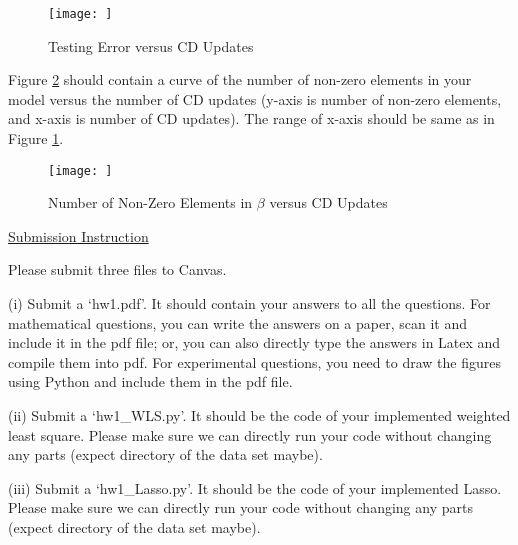 \documentclass{llncs}
\begin{document}
\begin{figure}[h]
    \centering
    \texttt{[image: ]}
    \caption{Testing Error versus CD Updates}
    \label{fig1}
\end{figure}

Figure \ref{fig2} should contain a curve of the number of non-zero elements in your model 
versus the number of CD updates (y-axis is number of non-zero elements, and x-axis is number of CD updates). The range of x-axis should be same 
as in Figure \ref{fig1}. 

\begin{figure}[h]
    \centering
    \texttt{[image: ]}
    \caption{Number of Non-Zero Elements in 
    $\beta$ versus CD Updates}
    \label{fig2}
\end{figure}

\vfill

\underline{Submission Instruction}

Please submit three files to Canvas. 

(i) Submit a `hw1.pdf'. It should contain 
your answers to all the questions. 
For mathematical questions, you can 
write the answers on a paper, scan it and 
include it in the pdf file; or, you can 
also directly type the answers in Latex 
and compile them into pdf. For experimental 
questions, you need to draw the figures 
using Python and include them in the pdf file. 

(ii) Submit a `hw1\_WLS.py'. It should 
be the code of your implemented weighted 
least square. Please make sure we can 
directly run your code without changing 
any parts (expect directory of the data 
set maybe). 

(iii) Submit a `hw1\_Lasso.py'. It should 
be the code of your implemented Lasso. 
Please make sure we can directly run your 
code without changing any parts (expect 
directory of the data set maybe). 
\end{document}
